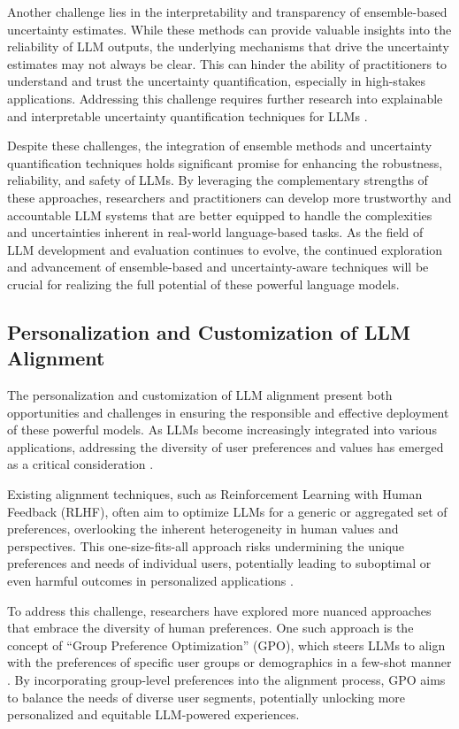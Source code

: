 \documentclass[11pt]{article}
\begin{document}
Another challenge lies in the interpretability and transparency of ensemble-based uncertainty estimates. While these methods can provide valuable insights into the reliability of LLM outputs, the underlying mechanisms that drive the uncertainty estimates may not always be clear. This can hinder the ability of practitioners to understand and trust the uncertainty quantification, especially in high-stakes applications. Addressing this challenge requires further research into explainable and interpretable uncertainty quantification techniques for LLMs \cite{ref201,ref202}.

Despite these challenges, the integration of ensemble methods and uncertainty quantification techniques holds significant promise for enhancing the robustness, reliability, and safety of LLMs. By leveraging the complementary strengths of these approaches, researchers and practitioners can develop more trustworthy and accountable LLM systems that are better equipped to handle the complexities and uncertainties inherent in real-world language-based tasks. As the field of LLM development and evaluation continues to evolve, the continued exploration and advancement of ensemble-based and uncertainty-aware techniques will be crucial for realizing the full potential of these powerful language models.

\subsection{Personalization and Customization of LLM Alignment}

The personalization and customization of LLM alignment present both opportunities and challenges in ensuring the responsible and effective deployment of these powerful models. As LLMs become increasingly integrated into various applications, addressing the diversity of user preferences and values has emerged as a critical consideration \cite{ref163}.

Existing alignment techniques, such as Reinforcement Learning with Human Feedback (RLHF), often aim to optimize LLMs for a generic or aggregated set of preferences, overlooking the inherent heterogeneity in human values and perspectives. This one-size-fits-all approach risks undermining the unique preferences and needs of individual users, potentially leading to suboptimal or even harmful outcomes in personalized applications \cite{ref203}.

To address this challenge, researchers have explored more nuanced approaches that embrace the diversity of human preferences. One such approach is the concept of ``Group Preference Optimization'' (GPO), which steers LLMs to align with the preferences of specific user groups or demographics in a few-shot manner \cite{ref204}. By incorporating group-level preferences into the alignment process, GPO aims to balance the needs of diverse user segments, potentially unlocking more personalized and equitable LLM-powered experiences.
\end{document}
